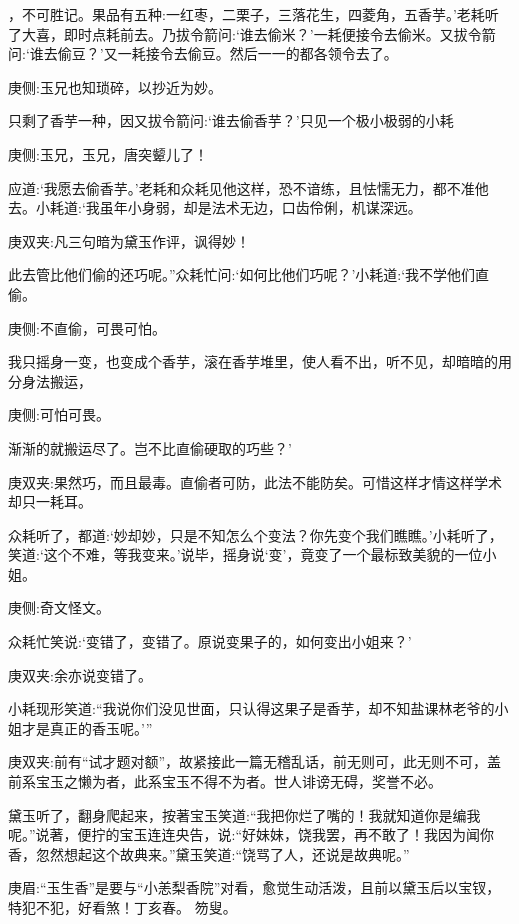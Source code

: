 \begin{parag}
，不可胜记。果品有五种:一红枣，二栗子，三落花生，四菱角，五香芋。’老耗听了大喜，即时点耗前去。乃拔令箭问:‘谁去偷米？’一耗便接令去偷米。又拔令箭问:‘谁去偷豆？’又一耗接令去偷豆。然后一一的都各领令去了。\begin{note}庚侧:玉兄也知琐碎，以抄近为妙。\end{note}只剩了香芋一种，因又拔令箭问:‘谁去偷香芋？’只见一个极小极弱的小耗\begin{note}庚侧:玉兄，玉兄，唐突颦儿了！\end{note}应道:‘我愿去偷香芋。’老耗和众耗见他这样，恐不谙练，且怯懦无力，都不准他去。小耗道:‘我虽年小身弱，却是法术无边，口齿伶俐，机谋深远。\begin{note}庚双夹:凡三句暗为黛玉作评，讽得妙！\end{note}此去管比他们偷的还巧呢。”众耗忙问:‘如何比他们巧呢？’小耗道:‘我不学他们直偷。\begin{note}庚侧:不直偷，可畏可怕。\end{note}我只摇身一变，也变成个香芋，滚在香芋堆里，使人看不出，听不见，却暗暗的用分身法搬运，\begin{note}庚侧:可怕可畏。\end{note}渐渐的就搬运尽了。岂不比直偷硬取的巧些？’\begin{note}庚双夹:果然巧，而且最毒。直偷者可防，此法不能防矣。可惜这样才情这样学术却只一耗耳。\end{note}众耗听了，都道:‘妙却妙，只是不知怎么个变法？你先变个我们瞧瞧。’小耗听了，笑道:‘这个不难，等我变来。’说毕，摇身说‘变’，竟变了一个最标致美貌的一位小姐。\begin{note}庚侧:奇文怪文。\end{note}众耗忙笑说:‘变错了，变错了。原说变果子的，如何变出小姐来？’\begin{note}庚双夹:余亦说变错了。\end{note}小耗现形笑道:“我说你们没见世面，只认得这果子是香芋，却不知盐课林老爷的小姐才是真正的香玉呢。’”\begin{note}庚双夹:前有“试才题对额”，故紧接此一篇无稽乱话，前无则可，此无则不可，盖前系宝玉之懒为者，此系宝玉不得不为者。世人诽谤无碍，奖誉不必。\end{note}
\end{parag}


\begin{parag}
    黛玉听了，翻身爬起来，按著宝玉笑道:“我把你烂了嘴的！我就知道你是编我呢。”说著，便拧的宝玉连连央告，说:“好妹妹，饶我罢，再不敢了！我因为闻你香，忽然想起这个故典来。”黛玉笑道:“饶骂了人，还说是故典呢。”\begin{note}庚眉:“玉生香”是要与“小恙梨香院”对看，愈觉生动活泼，且前以黛玉后以宝钗，特犯不犯，好看煞！丁亥春。 笏叟。\end{note}
\end{parag}



